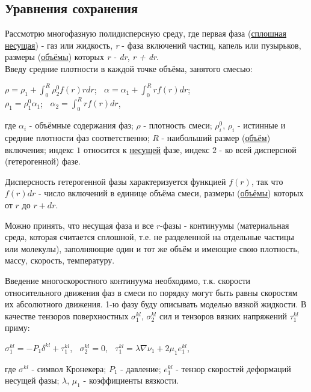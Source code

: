 \documentclass[12pt, a4paper]{report}
\begin{document}
	\subsection*{Уравнения сохранения}
	\large
	Рассмотрю многофазную полидисперсную среду, где первая фаза (\underline{сплошная несущая}) - газ или жидкость, \textit{r} - фаза включений частиц, капель или пузырьков, размеры (\underline{объёмы}) которых \textit{r - dr}, \textit{r + dr}. \\
	Введу средние плотности в каждой точке объёма, занятого смесью:
	\begin{center}
		$\rho = \rho_{1} + \int_{0}^{R} \rho_{2}^{0} f(r)rdr$; $\>$ $\alpha = \alpha_{1} + \int_{0}^{R} rf(r)dr$; \\
		$\rho_{1} = \rho_{1}^{0} \alpha_{1}$; $\>$ $\alpha_{2} = \int_{0}^{R} rf(r)dr$,
	\end{center}
	где $\alpha_{i}$ - объёмные содержания фаз; $\rho$ - плотность смеси; $\rho_{i}^{0}$, $\rho_{i}$ - истинные и средние плотности фаз соответственно; $R$ - наибольший размер (\underline{объём}) включения; индекс $1$ относится к \underline{несущей} фазе, индекс $2$ - ко всей дисперсной (гетерогенной) фазе. \par
	Дисперсность гетерогенной фазы характеризуется функцией $f(r)$, так что $f(r)dr$ - число включений в единице объёма смеси, размеры (\underline{объёмы}) которых от $r$ до $r + dr$. \par
	Можно принять, что несущая фаза и все $r$-фазы - континуумы (материальная среда, которая считается сплошной, т.е. не разделенной на отдельные частицы или молекулы), заполняющие один и тот же объём и имеющие свою плотность, массу, скорость, температуру. \par
	Введение многоскоростного континуума необходимо, т.к. скорости относительного движения фаз в смеси по порядку могут быть равны скоростям их абсолютного движения. 1-ю фазу буду описывать моделью вязкой жидкости. В качестве тензоров поверхностных $\sigma_{1}^{kl}$, $\sigma_{2}^{kl}$ сил и тензоров вязких напряжений $\tau_{1}^{kl}$ приму:
	\begin{center}
		$\sigma_{1}^{kl} = -P_{1}\delta^{kl} + \tau_{1}^{kl}$, $\>$ $\sigma_{2}^{kl} = 0$, $\>$ $\tau_{1}^{kl} = \lambda \nabla \nu_{1} + 2\mu_{1}e_{1}^{kl}$,
	\end{center}
	где $\sigma^{kl}$ - символ Кронекера; $P_{1}$ - давление; $e_{1}^{kl}$ - тензор скоростей деформаций несущей фазы; $\lambda$, $\mu_{1}$ - коэффициенты вязкости. \par
\end{document}
